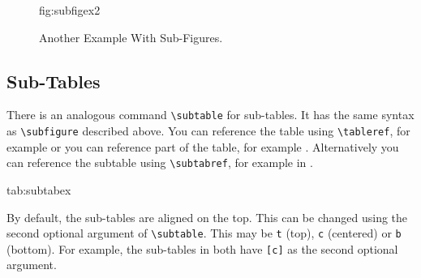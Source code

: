 \documentclass[pmlr,twocolumn,10pt]{jmlr} %
\begin{document}
\begin{figure}[htbp]
\floatconts
  {fig:subfigex2}
  {\caption{Another Example With Sub-Figures.}}
  {%
    \qquad
  }
\end{figure}

\subsection{Sub-Tables}
\label{sec:subtables}
There is an analogous command \verb|\subtable| for sub-tables.
It has the same syntax as \verb|\subfigure| described above.
You can reference the table using \verb|\tableref|, for example
 or you can reference part of the table,
for example . Alternatively you can reference the
subtable using \verb|\subtabref|, for example
 in .

\begin{table}[htbp]
\floatconts
 {tab:subtabex}
 {\caption{An Example With Sub-Tables}}
 {%
   \qquad
 }
\end{table}

By default, the sub-tables are aligned on the top.
This can be changed using the second optional argument
of \verb|\subtable|. This may be \texttt{t} (top), \texttt{c}
(centered) or \texttt{b} (bottom). For example, the sub-tables
 in 
both have \verb|[c]| as the second optional argument.
\end{document}
